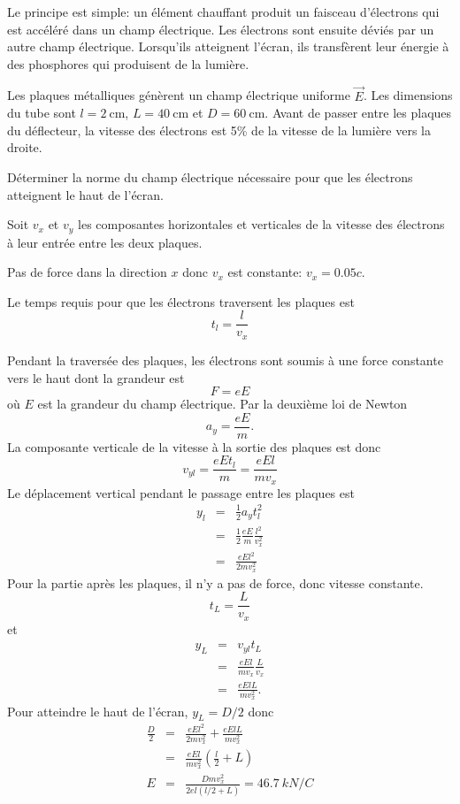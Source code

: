 Le principe est simple: un élément chauffant produit un faisceau d'électrons
qui est accéléré dans un champ électrique. Les électrons sont ensuite déviés
par un autre champ électrique. Lorsqu'ils atteignent l'écran, ils transfèrent
leur énergie à des phosphores qui produisent de la lumière.

Les plaques métalliques génèrent un champ électrique uniforme $\vec{E}$.
Les dimensions du tube sont $l = \SI{2}{\centi\meter}$, $L =
\SI{40}{\centi\meter}$ et $D = \SI{60}{\centi\meter}$.  Avant de passer entre
les plaques du déflecteur, la vitesse des électrons est
5\% de la vitesse de la lumière vers la droite.

Déterminer la norme du champ électrique nécessaire pour que les électrons
atteignent le haut de l'écran.


Soit $v_x$ et $v_y$ les composantes horizontales et verticales de la vitesse
des électrons à leur entrée entre les deux plaques.

Pas de force dans la direction $x$ donc $v_x$ est constante: $v_x = 0.05c$.

Le temps requis pour que les électrons traversent les plaques est
\[
  t_l = \frac{l}{v_x}
\]

Pendant la traversée des plaques, les électrons sont soumis à une force
constante vers le haut dont la grandeur est
\[
  F = eE
\]
où $E$ est la grandeur du champ électrique. Par la deuxième loi de Newton
\[
  a_y = \frac{eE}{m}.
\]
La composante verticale de la vitesse à la sortie des plaques est donc
\[
  v_{yl} = \frac{eE t_l}{m} = \frac{eEl}{mv_x}
\]
Le déplacement vertical pendant le passage entre les plaques est
\begin{eqnarray*}
  y_l &=& \frac{1}{2} a_y t_l^2 \\
  &=& \frac{1}{2} \frac{eE}{m} \frac{l^2}{v_x^2} \\
  &=& \frac{eEl^2}{2mv_x^2}
\end{eqnarray*}
Pour la partie après les plaques, il n'y a pas de force, donc vitesse
constante.
\[
  t_L = \frac{L}{v_x}
\]
et
\begin{eqnarray*}
  y_L &=& v_{yl} t_L \\
  &=& \frac{eEl}{mv_x}\frac{L}{v_x} \\
  &=& \frac{eElL}{mv_x^2}.
\end{eqnarray*}
Pour atteindre le haut de l'écran, $y_L = D/2$ donc
\begin{eqnarray*}
  \frac{D}{2} &=& \frac{eEl^2}{2mv_x^2} + \frac{eElL}{mv_x^2} \\
   &=& \frac{eEl}{mv_x^2} \left(\frac{l}{2} + L\right) \\
  E &=& \frac{Dmv_x^2}{2el (l/2 + L)} = \SI{46.7}{kN/C}
\end{eqnarray*}


